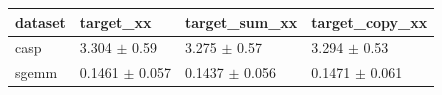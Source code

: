 \begin{tabular}{llll}
\toprule
dataset & target\_xx & target\_sum\_xx & target\_copy\_xx \\
\midrule
casp & 3.304 $\pm$ 0.59 & 3.275 $\pm$ 0.57 & 3.294 $\pm$ 0.53 \\
sgemm & 0.1461 $\pm$ 0.057 & 0.1437 $\pm$ 0.056 & 0.1471 $\pm$ 0.061 \\
\bottomrule
\end{tabular}

